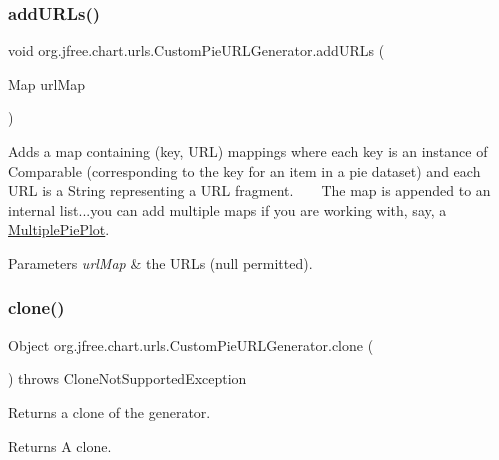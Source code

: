 \subsubsection{\texorpdfstring{add\+U\+R\+Ls()}{addURLs()}}
{\footnotesize\ttfamily void org.\+jfree.\+chart.\+urls.\+Custom\+Pie\+U\+R\+L\+Generator.\+add\+U\+R\+Ls (\begin{DoxyParamCaption}\item[{Map}]{url\+Map }\end{DoxyParamCaption})}

Adds a map containing {\ttfamily (key, U\+RL)} mappings where each {\ttfamily key} is an instance of {\ttfamily Comparable} (corresponding to the key for an item in a pie dataset) and each {\ttfamily U\+RL} is a {\ttfamily String} representing a U\+RL fragment. ~\newline
~\newline
 The map is appended to an internal list...you can add multiple maps if you are working with, say, a \mbox{\hyperlink{}{Multiple\+Pie\+Plot}}.


\begin{DoxyParams}{Parameters}
{\em url\+Map} & the U\+R\+Ls ({\ttfamily null} permitted). \\
\hline
\end{DoxyParams}
\mbox{\label{classorg_1_1jfree_1_1chart_1_1urls_1_1_custom_pie_u_r_l_generator_a138c6be61492891b1373d42c3c96c93f}} 
\subsubsection{\texorpdfstring{clone()}{clone()}}
{\footnotesize\ttfamily Object org.\+jfree.\+chart.\+urls.\+Custom\+Pie\+U\+R\+L\+Generator.\+clone (\begin{DoxyParamCaption}{ }\end{DoxyParamCaption}) throws Clone\+Not\+Supported\+Exception}

Returns a clone of the generator.

\begin{DoxyReturn}{Returns}
A clone.
\end{DoxyReturn}

